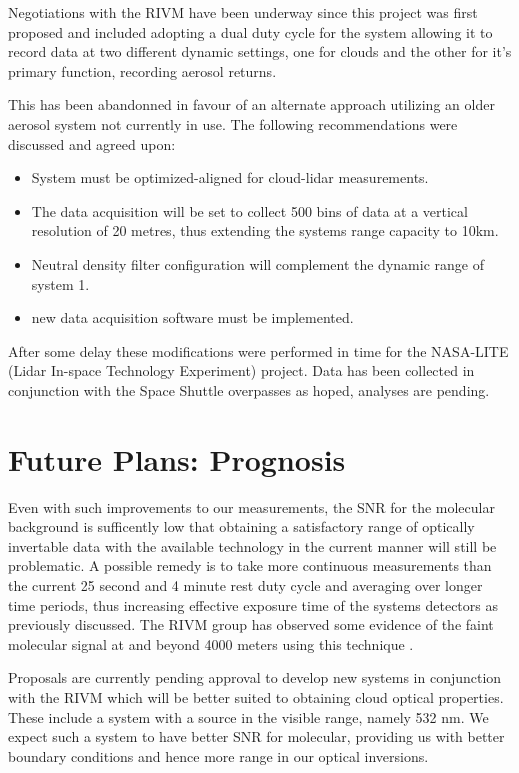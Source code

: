 Negotiations with the RIVM have been underway since this project
was first proposed and included adopting a dual duty cycle
for the system allowing it to record data at two different
dynamic settings, one for clouds and the other for it's primary
function, recording aerosol returns.

This has been abandonned in favour of an alternate approach
utilizing an older aerosol system not currently in use.
The following recommendations were discussed and agreed upon:

\begin{itemize} 
\item System must be optimized-aligned for cloud-lidar measurements.
\item The data acquisition will be set to collect 500 bins of data at a 
vertical resolution of 20 metres, thus extending the systems range 
capacity to 10km.
\item Neutral density filter configuration will complement the dynamic 
range of system 1.
\item new data acquisition software must be implemented.
\end{itemize} 

After some delay these modifications were performed in time
for the NASA-LITE (Lidar In-space Technology Experiment) project.
Data has been collected in conjunction with the Space Shuttle
overpasses as hoped, analyses are pending.

\section{Future Plans: Prognosis}

Even with such improvements to our measurements, the SNR for
the molecular background is sufficently low that obtaining
a satisfactory range of optically invertable data with the 
available technology in the current manner will still be problematic.
A possible remedy is to take more continuous measurements than
the current 25 second and 4 minute rest duty cycle and averaging over longer
time periods, thus increasing effective exposure time of the 
systems detectors as previously discussed. The RIVM group has 
observed some evidence of the faint molecular signal at 
and beyond 4000 meters using this technique \cite{evpd}.

Proposals are currently pending approval to develop new systems in 
conjunction with the RIVM which will be better suited to obtaining
cloud optical properties. These include a system with a source
in the visible range, namely 532 nm. We expect such a system to have
better SNR for molecular, providing us with better boundary
conditions and hence more range in our optical inversions.

